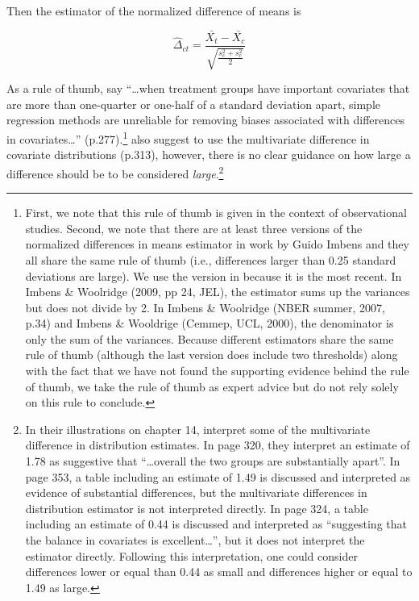 Then the estimator of the normalized difference of means is

\begin{equation*}
  \hat{\Delta}_{ct}=
    \frac{\bar{X_t}-\bar{X_c}}
         {\sqrt{\frac{s_c^2+s_c^2}{2}}}
\end{equation*}


As a rule of thumb, \citet{imbensCausalInferenceStatistics2015} say \enquote{\ldots when treatment groups have important covariates that are more than one-quarter or one-half of a standard deviation apart, simple regression methods are unreliable for removing biases associated with differences in covariates\ldots} (p.277).\footnote{First, we note that this rule of thumb is given in the context of observational studies. Second, we note that there are at least three versions of the normalized differences in means estimator in work by Guido Imbens and they all share the same rule of thumb (i.e., differences larger than 0.25 standard deviations are large). We use the version in \citet{imbensCausalInferenceStatistics2015} because it is the most recent. In Imbens \& Woolridge (2009, pp 24, JEL), the estimator sums up the variances but does not divide by 2. In Imbens \& Woolridge (NBER summer, 2007, p.34) and Imbens \& Wooldrige (Cemmep, UCL, 2000), the denominator is only the sum of the variances. Because different estimators share the same rule of thumb (although the last version does include two thresholds) along with the fact that we have not found the supporting evidence behind the rule of thumb, we take the rule of thumb as expert advice but do not rely solely on this rule to conclude.} \citet{imbensCausalInferenceStatistics2015} also suggest to use the multivariate difference in covariate distributions (p.313), however, there is no clear guidance on how large a difference should be to be considered \emph{large}.\footnote{In their illustrations on chapter 14, \citet{imbensCausalInferenceStatistics2015} interpret some of the multivariate difference in distribution estimates. In page 320, they interpret an estimate of 1.78 as suggestive that \enquote{…overall the two groups are substantially apart}. In page 353, a table including an estimate of 1.49 is discussed and interpreted as evidence of substantial differences, but the multivariate differences in distribution estimator is not interpreted directly. In page 324, a table including an estimate of 0.44 is discussed and interpreted as \enquote{suggesting that the balance in covariates is excellent\ldots}, but it does not interpret the estimator directly. Following this interpretation, one could consider differences lower or equal than 0.44 as small and differences higher or equal to 1.49 as large.}

